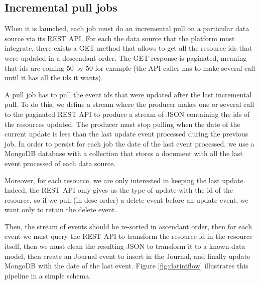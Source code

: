 \subsection{Incremental pull jobs}

When it is launched, each job must do an incremental pull on a particular data source via its REST API. For each the data source that the platform must integrate, there exists
a GET method that allows to get all the resource ids that were updated in a descendant order. The GET response is paginated, meaning that ids are coming 50 by 50 for example (the 
API caller has to make several call until it has all the ids it wants). 

A pull job has to pull the event ids that were updated after the last incremental pull. To do this, we define a stream where the producer makes one or several call to the
paginated REST API to produce a stream of JSON containing the ids of the resources updated. The producer must stop pulling when the date of the current update is less than the last
update event processed during the previous job. In order to persist for each job the date of the last event processed, we use a MongoDB database with a collection that stores a 
document with all the last event processed of each data source.

Moreover, for each resource, we are only interested in keeping the last update. Indeed, the REST API only gives us the type of update with the id of the resource, so if we pull (in desc order) a delete event before an update event, we want only to retain the delete event.

Then, the stream of events should be re-sorted in ascendant order, then for each event we must query the REST API to transform the resource id in the resource itself, then we must clean the resulting JSON to transform it to a known data model, then create an Journal event to insert in the Journal, and finally update MongoDB with the date of the last event.
Figure \ref{fig:datintflow} illustrates this pipeline in a simple schema. 

